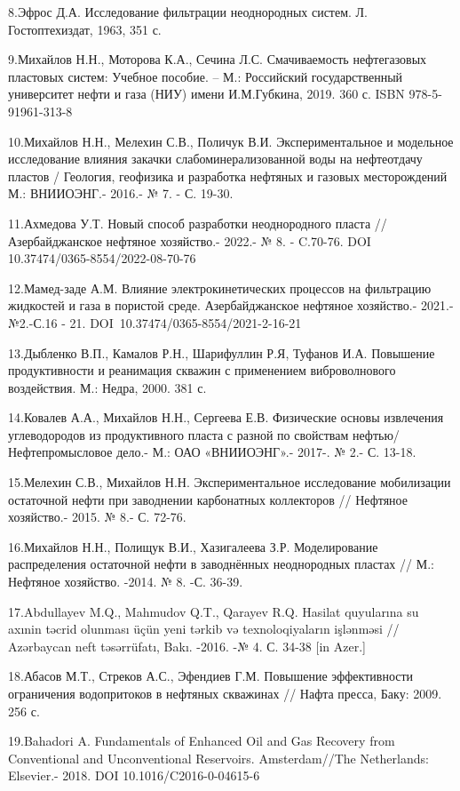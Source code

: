 {{8.Эфрос Д.А. Исследование фильтрации неоднородных систем. Л.
Гостоптехиздат, 1963, 351 с.

9.Михайлов Н.Н., Моторова К.А., Сечина Л.С. Смачиваемость нефтегазовых
пластовых систем: Учебное пособие. -- М.: Российский государственный
университет нефти и газа (НИУ) имени И.М.Губкина, 2019. 360 с. ISBN
978-5-91961-313-8

10.Михайлов Н.Н., Мелехин С.В., Поличук В.И. Экспериментальное и
модельное исследование влияния закачки слабоминерализованной воды на
нефтеотдачу пластов / Геология, геофизика и разработка нефтяных и
газовых месторождений М.: ВНИИОЭНГ.- 2016.- № 7. - С. 19-30.

11.Ахмедова У.Т. Новый способ разработки неоднородного пласта //
Азербайджанское нефтяное хозяйство.- 2022.- № 8. - C.70-76. DOI
10.37474/0365-8554/2022-08-70-76

12.Мамед-заде А.М. Влияние электрокинетических процессов на фильтрацию
жидкостей и газа в пористой среде. Азербайджанское нефтяное хозяйство.-
2021.-№2.-С.16 - 21. DOI~10.37474/0365-8554/2021-2-16-21

13.Дыбленко В.П., Камалов Р.Н., Шарифуллин Р.Я, Туфанов И.А. Повышение
продуктивности и реанимация скважин с применением виброволнового
воздействия. М.: Недра, 2000. 381 с.

14.Ковалев А.А., Михайлов Н.Н., Сергеева Е.В. Физические основы
извлечения углеводородов из продуктивного пласта с разной по свойствам
нефтью/ Нефтепромысловое дело.- М.: ОАО «ВНИИОЭНГ».- 2017-. № 2.- С.
13-18.

15.Мелехин С.В., Михайлов Н.Н. Экспериментальное исследование
мобилизации остаточной нефти при заводнении карбонатных коллекторов //
Нефтяное хозяйство.- 2015. № 8.- С. 72-76.

16.Михайлов Н.Н., Полищук В.И., Хазигалеева З.Р. Моделирование
распределения остаточной нефти в заводнённых неоднородных пластах // М.:
Нефтяное хозяйство. -2014. № 8. -С. 36-39.

17.Abdullayev M.Q., Mahmudov Q.T., Qarayev R.Q. Hasilat quyularına su
axınin təcrid olunması üçün yeni tərkib və texnoloqiyaların işlənməsi //
Azərbaycan neft təsərrüfatı, Bakı. -2016. -№ 4. С. 34-38 {[}in Azer.{]}

18.Абасов М.Т., Стреков А.С., Эфендиев Г.М. Повышение эффективности
ограничения водопритоков в нефтяных скважинах // Нафта пресса, Баку:
2009. 256 с.

19.Bahadori A. Fundamentals of Enhanced Oil and Gas Recovery from
Conventional and Unconventional Reservoirs. Amsterdam//The Netherlands:
Elsevier.- 2018. DOI 10.1016/C2016-0-04615-6

}}

